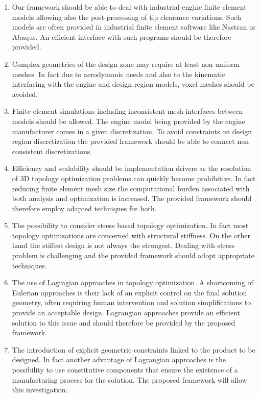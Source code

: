 \begin{enumerate}
\item Our framework should be able to deal with industrial engine finite element models allowing also the post-processing of tip clearance variations. Such models are often provided in industrial finite element software like Nastran or Abaqus. An efficient interface with such programs should be therefore provided.
\item Complex geometries of the design zone may require at least non uniform meshes. In fact due to aerodynamic needs and also to the kinematic interfacing with the engine and design region models, voxel meshes should be avoided.  
\item  Finite element simulations including inconsistent mesh interfaces between models should be allowed. The engine model being provided by the engine manufacturer comes in a given discretization. To avoid constraints on design region discretization the provided framework should be able to connect non consistent discretizations.
\item  Efficiency and scalability should be implementation drivers as the resolution of 3D topology optimization problems can quickly become prohibitive. In fact reducing finite element mesh size the computational burden associated with both analysis and optimization is increased. The provided framework should therefore employ adapted techniques for both.  
\item The possibility to consider stress based topology optimization. In fact most topology optimizations are concerned with  structural stiffness. On the other hand the stiffest design is not always the strongest. Dealing with stress problem is challenging and the provided framework should adopt appropriate techniques. 
\item The use of Lagragian approaches in topology optimization. A shortcoming of Eulerian approaches is their lack of an explicit control on the final solution geometry, often requiring human intervention and solution simplifications to provide an acceptable design. Lagrangian approaches provide an efficient solution to this issue and should therefore be provided by the proposed framework.
\item The introduction of explicit geometric constraints linked to the product to be designed. In fact another advantage of Lagrangian approaches is the possibility to use constitutive components that ensure the existence of a manufacturing process for the solution. The proposed framework will allow this investigation.
\end{enumerate}
